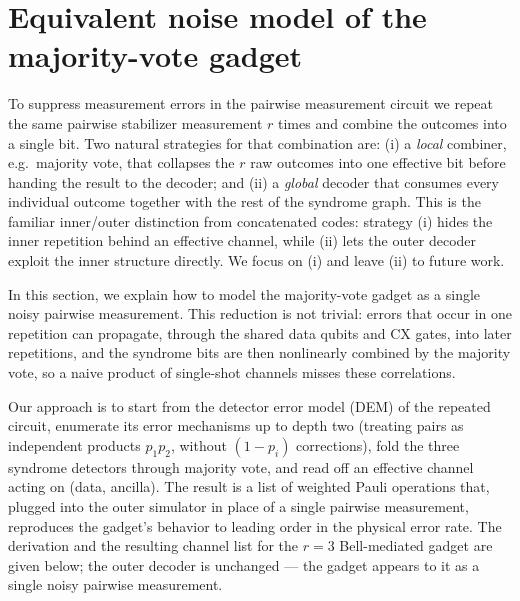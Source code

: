 \section{Equivalent noise model of the majority-vote gadget}
\label{sec:majority-vote-equivalent-noise-model}

To suppress measurement errors in the pairwise measurement circuit we repeat the same pairwise stabilizer measurement $r$ times and combine the outcomes into a single bit.
Two natural strategies for that combination are: (i) a \emph{local} combiner, e.g.\ majority vote, that collapses the $r$ raw outcomes into one effective bit before handing the result to the decoder; and (ii) a \emph{global} decoder that consumes every individual outcome together with the rest of the syndrome graph.
This is the familiar inner/outer distinction from concatenated codes: strategy (i) hides the inner repetition behind an effective channel, while (ii) lets the outer decoder exploit the inner structure directly.
We focus on (i) and leave (ii) to future work.

In this section, we explain how to model the majority-vote gadget as a single noisy pairwise measurement.
This reduction is not trivial: errors that occur in one repetition can propagate, through the shared data qubits and CX gates, into later repetitions, and the syndrome bits are then nonlinearly combined by the majority vote, so a naive product of single-shot channels misses these correlations.

Our approach is to start from the detector error model (DEM) of the repeated circuit, enumerate its error mechanisms up to depth two (treating pairs as independent products $p_1 p_2$, without $(1-p_i)$ corrections), fold the three syndrome detectors through majority vote, and read off an effective channel acting on (data, ancilla).
The result is a list of weighted Pauli operations that, plugged into the outer simulator in place of a single pairwise measurement, reproduces the gadget's behavior to leading order in the physical error rate.
The derivation and the resulting channel list for the $r=3$ Bell-mediated gadget are given below; the outer decoder is unchanged --- the gadget appears to it as a single noisy pairwise measurement.
